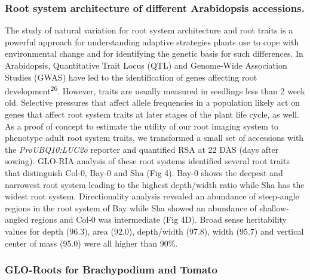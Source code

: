 \documentclass[]{article}
\begin{document}
\subsubsection{Root system architecture of different Arabidopsis
accessions.}\label{root-system-architecture-of-different-arabidopsis-accessions.}

The study of natural variation for root system architecture and root
traits is a powerful approach for understanding adaptive strategies
plants use to cope with environmental change and for identifying the
genetic basis for such differences. In Arabidopsis, Quantitative Trait
Locus (QTL) and Genome-Wide Association Studies (GWAS) have led to the
identification of genes affecting root development\textsuperscript{26}.
However, traits are usually measured in seedlings less than 2 week old.
Selective pressures that affect allele frequencies in a population
likely act on genes that affect root system traits at later stages of
the plant life cycle, as well. As a proof of concept to estimate the
utility of our root imaging system to phenotype adult root system
traits, we transformed a small set of accessions with the
\emph{ProUBQ10:LUC2o} reporter and quantified RSA at 22 DAS (days after
sowing). GLO-RIA analysis of these root systems identified several root
traits that distinguish Col-0, Bay-0 and Sha (Fig 4). Bay-0 shows the
deepest and narrowest root system leading to the highest depth/width
ratio while Sha has the widest root system. Directionality analysis
revealed an abundance of steep-angle regions in the root system of Bay
while Sha showed an abundance of shallow-angled regions and Col-0 was
intermediate (Fig 4D). Broad sense heritability values for depth (96.3),
area (92.0), depth/width (97.8), width (95.7) and vertical center of
mass (95.0) were all higher than 90\%. ~

\subsubsection{GLO-Roots for Brachypodium and
Tomato}\label{glo-roots-for-brachypodium-and-tomato}
\end{document}
